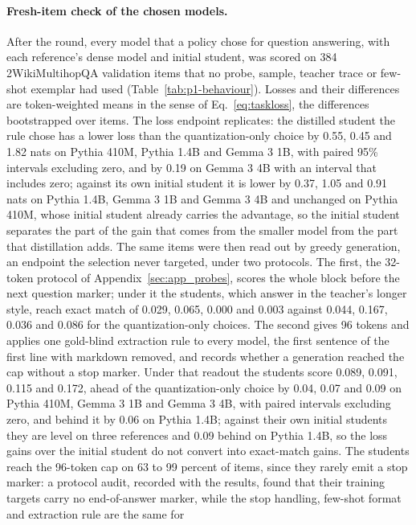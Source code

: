 \paragraph{Fresh-item check of the chosen models.} After the round, every model that a policy chose
for question answering, with each reference's dense model and initial student, was scored on 384
2WikiMultihopQA validation items that no probe, sample, teacher trace or few-shot exemplar had used
(Table~\ref{tab:p1-behaviour}). Losses and their differences are token-weighted means in the sense
of Eq.~\ref{eq:taskloss}, the differences bootstrapped over items. The loss endpoint replicates: the
distilled student the rule chose has a lower loss than the quantization-only choice by 0.55, 0.45 and
1.82 nats on Pythia 410M, Pythia 1.4B and Gemma 3 1B, with paired 95\% intervals excluding zero, and
by 0.19 on Gemma 3 4B with an interval that includes zero; against its own initial student it is lower
by 0.37, 1.05 and 0.91 nats on Pythia 1.4B, Gemma 3 1B and Gemma 3 4B and unchanged on Pythia 410M,
whose initial student already carries the advantage, so the initial student separates the part of the
gain that comes from the smaller model from the part that distillation adds. The same items were
then read out by greedy generation, an endpoint the selection never targeted, under two protocols.
The first, the 32-token protocol of Appendix~\ref{sec:app_probes}, scores the whole block before
the next question marker; under it the students, which answer in the teacher's longer style, reach
exact match of 0.029, 0.065, 0.000 and 0.003 against 0.044, 0.167, 0.036 and 0.086 for the
quantization-only choices. The second gives 96 tokens and applies one gold-blind extraction rule
to every model, the first sentence of the first line with markdown removed, and records whether a
generation reached the cap without a stop marker. Under that readout the students score 0.089,
0.091, 0.115 and 0.172, ahead of the quantization-only choice by 0.04, 0.07 and 0.09 on Pythia
410M, Gemma 3 1B and Gemma 3 4B, with paired intervals excluding zero, and behind it by 0.06 on
Pythia 1.4B; against their own initial students they are level on three references and 0.09 behind
on Pythia 1.4B, so the loss gains over the initial student do not convert into exact-match gains.
The students reach the 96-token cap on 63 to 99 percent of items, since they rarely emit a stop
marker: a protocol audit, recorded with the results, found that their training targets carry no
end-of-answer marker, while the stop handling, few-shot format and extraction rule are the same for
